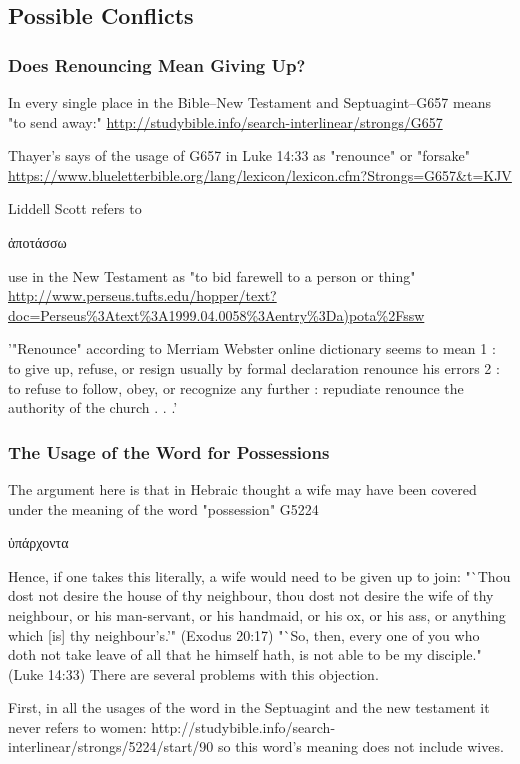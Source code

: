 \documentclass[11pt]{article}
\begin{document}
\subsection{Possible Conflicts}
\subsubsection{Does Renouncing Mean Giving Up?}
In every single place in the Bible--New Testament and Septuagint--G657 means "to send away:"
\url{http://studybible.info/search-interlinear/strongs/G657}

Thayer's says of the usage of G657 in Luke 14:33 as "renounce" or "forsake"
\url{https://www.blueletterbible.org/lang/lexicon/lexicon.cfm?Strongs=G657&t=KJV}

Liddell Scott refers to \begin{greek} ἀποτάσσω \end{greek} use in the New Testament as "to bid farewell to a person or thing"
\url{http://www.perseus.tufts.edu/hopper/text?doc=Perseus\%3Atext\%3A1999.04.0058\%3Aentry\%3Da)pota\%2Fssw}

'"Renounce" according to Merriam Webster online dictionary seems to mean 
1
:  to give up, refuse, or resign usually by formal declaration renounce his errors
2
:  to refuse to follow, obey, or recognize any further :  repudiate renounce the authority of the church
. . .' 
\cite{renounce}

\subsubsection{The Usage of the Word for Possessions}
The argument here is that in Hebraic thought a wife may have been covered under the meaning of the word "possession" G5224 \begin{greek}ὑπάρχοντα \end{greek} Hence, if one takes this literally, a wife would need to be given up to join:
"`Thou dost not desire the house of thy neighbour, thou dost not desire the wife of thy neighbour, or his man-servant, or his handmaid, or his ox, or his ass, or anything which [is] thy neighbour's.'" (Exodus 20:17)
"`So, then, every one of you who doth not take leave of all that he himself hath, is not able to be my disciple." (Luke 14:33) There are several problems with this objection.

First, in all the usages of the word in the Septuagint and the new testament it never refers to women: http://studybible.info/search-interlinear/strongs/5224/start/90 so this word's meaning does not include wives.
\end{document}
